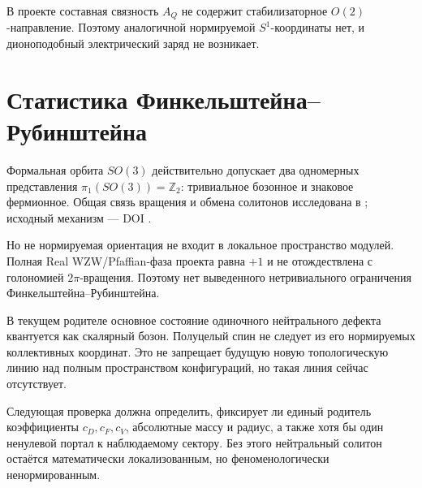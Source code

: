 В проекте составная связность $A_Q$ не содержит стабилизаторное
$O(2)$-направление. Поэтому аналогичной нормируемой $S^1$-координаты нет,
и дионоподобный электрический заряд не возникает.

\section{Статистика Финкельштейна--Рубинштейна}

Формальная орбита $SO(3)$ действительно допускает два одномерных
представления $\pi_1(SO(3))=\mathbb Z_2$: тривиальное бозонное и знаковое
фермионное. Общая связь вращения и обмена солитонов исследована в
; исходный механизм --- DOI
.

Но не нормируемая ориентация не входит в локальное пространство модулей.
Полная Real WZW/Pfaffian-фаза проекта равна $+1$ и не отождествлена с
голономией $2\pi$-вращения. Поэтому нет выведенного нетривиального
ограничения Финкельштейна--Рубинштейна.

\begin{proposition}
В текущем родителе основное состояние одиночного нейтрального дефекта
квантуется как скалярный бозон. Полуцелый спин не следует из его
нормируемых коллективных координат. Это не запрещает будущую новую
топологическую линию над полным пространством конфигураций, но такая линия
сейчас отсутствует.
\end{proposition}

Следующая проверка должна определить, фиксирует ли единый родитель
коэффициенты $c_D,c_F,c_V$, абсолютные массу и радиус, а также хотя бы один
ненулевой портал к наблюдаемому сектору. Без этого нейтральный солитон
остаётся математически локализованным, но феноменологически ненормированным.

